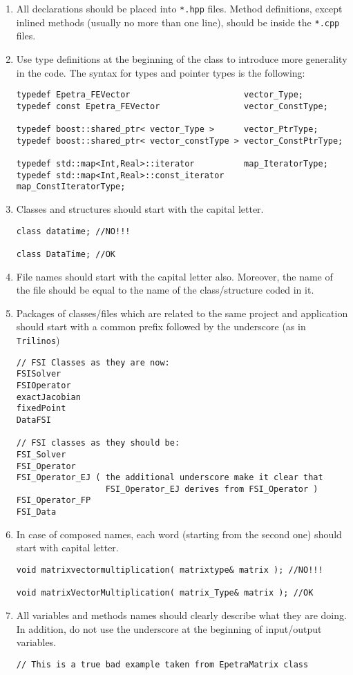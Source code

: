 \documentclass[a4paper]{article}
\begin{document}
\begin{enumerate}
  \item All declarations should be placed into \texttt{*.hpp} files. Method definitions, except inlined methods (usually no more than one line), should be inside the \texttt{*.cpp} files.
  \item Use type definitions at the beginning of the class to introduce more generality in the code. The syntax for types and pointer types is the following:
\begin{lstlisting}
typedef Epetra_FEVector                       vector_Type;
typedef const Epetra_FEVector                 vector_ConstType;

typedef boost::shared_ptr< vector_Type >      vector_PtrType;
typedef boost::shared_ptr< vector_constType > vector_ConstPtrType;

typedef std::map<Int,Real>::iterator          map_IteratorType;       
typedef std::map<Int,Real>::const_iterator    map_ConstIteratorType;
\end{lstlisting}
  \item Classes and structures should start with the capital letter.
\begin{lstlisting}
class datatime; //NO!!!

class DataTime; //OK
\end{lstlisting}
  \item File names should start with the capital letter also. Moreover, the name of the file should be equal to the name of the class/structure coded in it.
  \item Packages of classes/files which are related to the same project and application should start with a common prefix followed by the underscore
  (as in \texttt{Trilinos})
\begin{lstlisting}
// FSI Classes as they are now:
FSISolver
FSIOperator
exactJacobian
fixedPoint
DataFSI

// FSI classes as they should be:
FSI_Solver
FSI_Operator
FSI_Operator_EJ ( the additional underscore make it clear that 
                  FSI_Operator_EJ derives from FSI_Operator )
FSI_Operator_FP
FSI_Data
\end{lstlisting}
  \item In case of composed names, each word (starting from the second one) should start with capital letter.
\begin{lstlisting}
void matrixvectormultiplication( matrixtype& matrix ); //NO!!!

void matrixVectorMultiplication( matrix_Type& matrix ); //OK
\end{lstlisting}
  \item All variables and methods names should clearly describe what they are doing. In addition, do not use the underscore at the beginning of input/output variables.
\begin{lstlisting}
// This is a true bad example taken from EpetraMatrix class


\end{lstlisting}
\end{enumerate}
\end{document}
